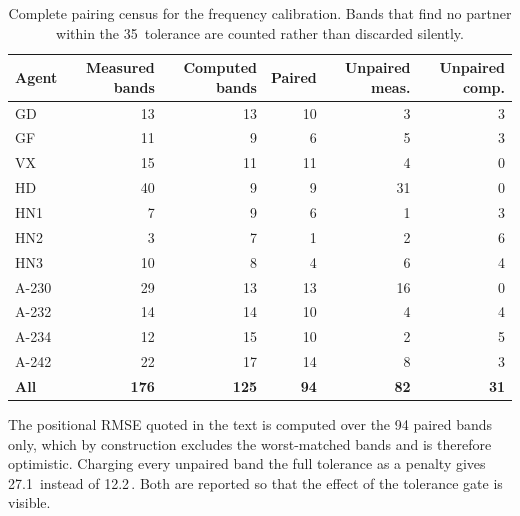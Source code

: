 \begin{table}[htbp]
\centering
\caption{Complete pairing census for the frequency calibration. Bands that find no partner within the 35\,\wn{} tolerance are counted rather than discarded silently.}
\label{tab:si-census}
\small
\begin{tabular}{lrrrrr}
\toprule
Agent & Measured bands & Computed bands & Paired & Unpaired meas. & Unpaired comp. \\
\midrule
GD & 13 & 13 & 10 & 3 & 3 \\
GF & 11 & 9 & 6 & 5 & 3 \\
VX & 15 & 11 & 11 & 4 & 0 \\
HD & 40 & 9 & 9 & 31 & 0 \\
HN1 & 7 & 9 & 6 & 1 & 3 \\
HN2 & 3 & 7 & 1 & 2 & 6 \\
HN3 & 10 & 8 & 4 & 6 & 4 \\
A-230 & 29 & 13 & 13 & 16 & 0 \\
A-232 & 14 & 14 & 10 & 4 & 4 \\
A-234 & 12 & 15 & 10 & 2 & 5 \\
A-242 & 22 & 17 & 14 & 8 & 3 \\
\textbf{All} & \textbf{176} & \textbf{125} & \textbf{94} & \textbf{82} & \textbf{31} \\
\bottomrule
\end{tabular}

\begin{flushleft}\footnotesize The positional RMSE quoted in the text is computed over the 94 paired bands only, which by construction excludes the worst-matched bands and is therefore optimistic. Charging every unpaired band the full tolerance as a penalty gives 27.1\,\wn{} instead of 12.2\,\wn{}. Both are reported so that the effect of the tolerance gate is visible.\end{flushleft}
\end{table}
